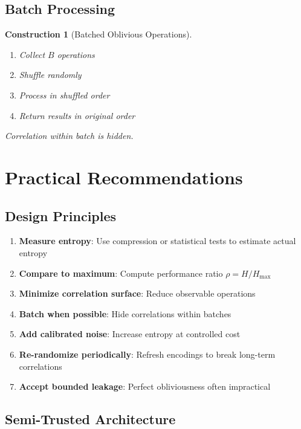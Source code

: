 \documentclass[11pt,final,hidelinks]{article}
\newtheorem{construction}[theorem]{Construction}
\begin{document}
\subsection{Batch Processing}

\begin{construction}[Batched Oblivious Operations]
\begin{enumerate}
    \item Collect $B$ operations
    \item Shuffle randomly
    \item Process in shuffled order
    \item Return results in original order
\end{enumerate}
Correlation within batch is hidden.
\end{construction}

\section{Practical Recommendations}

\subsection{Design Principles}

\begin{enumerate}
    \item \textbf{Measure entropy}: Use compression or statistical tests to estimate actual entropy
    \item \textbf{Compare to maximum}: Compute performance ratio $\rho = H/H_{\max}$
    \item \textbf{Minimize correlation surface}: Reduce observable operations
    \item \textbf{Batch when possible}: Hide correlations within batches
    \item \textbf{Add calibrated noise}: Increase entropy at controlled cost
    \item \textbf{Re-randomize periodically}: Refresh encodings to break long-term correlations
    \item \textbf{Accept bounded leakage}: Perfect obliviousness often impractical
\end{enumerate}

\subsection{Semi-Trusted Architecture}
\end{document}
